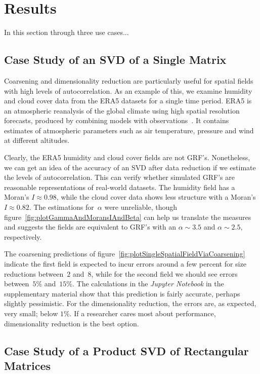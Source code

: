 \documentclass[ijgi,article,submit,moreauthors,pdftex,10pt,a4paper]{Definitions/mdpi}
\begin{document}
\section{Results}
In this section through three use cases...

\subsection{Case Study of an SVD of a Single Matrix}
\label{sec:Results/Case Study of an SVD of a Single Matrix}

Coarsening and dimensionality reduction are particularly useful for spatial fields with high levels of autocorrelation. As an example of this, we examine humidity and cloud cover data from the ERA5 datasets for a single time period. ERA5 is an atmospheric reanalysis of the global climate using high spatial resolution forecasts, produced by combining models with observations~\cite{Dee2011}. It contains estimates of atmospheric parameters such as air temperature, pressure and wind at different altitudes.

Clearly, the ERA5 humidity and cloud cover fields are not GRF's. Nonetheless, we can get an idea of the accuracy of an SVD after data reduction if we estimate the levels of autocorrelation. This can verify whether simulated GRF's are reasonable representations of real-world datasets. The humidity field has a Moran's $I \approx 0.98$, while the cloud cover data shows less structure with a Moran's $I \approx 0.82$. The estimations for~$\alpha$ were unreliable, though figure~\ref{fig:plotGammaAndMoransIAndBeta} can help us translate the measures and suggests the fields are equivalent to GRF's with an $\alpha \sim 3.5$ and $\alpha \sim 2.5$, respectively.

The coarsening predictions of figure~\ref{fig:plotSingleSpatialFieldViaCoarsening} indicate the first field is expected to incur errors around a few percent for size reductions between~$2$ and~$8$, while for the second field we should see errors between~$5\%$ and~$15\%$. The calculations in the \textit{Jupyter Notebook} in the supplementary material show that this prediction is fairly accurate, perhaps slightly pessimistic. For the dimensionality reduction, the errors are, as expected, very small; below $1\%$. If a researcher cares most about performance, dimensionality reduction is the best option.


\subsection{Case Study of a Product SVD of Rectangular Matrices}
\label{sec:Results/Case Study of a Product SVD of Rectangular Matrices}
\end{document}
